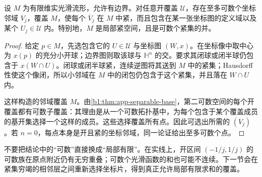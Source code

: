 \begin{proposition}[可数相对紧坐标覆盖]\label{b1:prop:E-countable-charts}
设 \(M\) 为有限维实光滑流形，允许有边界。对任意开覆盖 \(\mathcal U\)，存在至多可数个坐标邻域 \(V_j\)，覆盖 \(M\)，使每个 \(\overline V_j\) 在 \(M\) 中紧，而且包含在某一张坐标图的定义域以及某个 \(U_j\in\mathcal U\) 内。特别地，\(M\) 是局部紧空间，且是可数个紧集的并。
\end{proposition}
\begin{proof}
给定 \(p\in M\)，先选包含它的 \(U\in\mathcal U\) 与坐标图 \((W,x)\)。在坐标像中取中心为 \(x(p)\) 的充分小开球；边界图则取该球与 \(\mathbb H^n\) 的交。要求其闭球或闭半球仍包含于 \(x(W\cap U)\)。闭球或闭半球紧，连续逆图将其送到 \(M\) 中的紧集；Hausdorff 性使这个像闭，所以小邻域在 \(M\) 中的闭包仍包含于这个紧集，并且落在 \(W\cap U\) 内。

这样构造的邻域覆盖 \(M\)。由\cref{b1:thm:app-separable-base}，第二可数空间的每个开覆盖都有可数子覆盖：其理由是从一个可数拓扑基中，为每个包含于某个覆盖成员的基开集选择一个这样的成员。这些选择覆盖所有点。因此可选出所需的 \((V_j)\)。若 \(n=0\)，每点本身是开且紧的坐标邻域，同一论证给出至多可数个点。
\end{proof}

不要把结论中的“可数”直接换成“局部有限”。在实线上，开区间 \((-1/j,1/j)\) 的可数族在原点附近仍有无穷重叠；可数个光滑函数的和也可能不连续。下一节会在紧集穷竭的相邻层之间重新选择坐标片，得到真正允许局部有限求和的覆盖。
